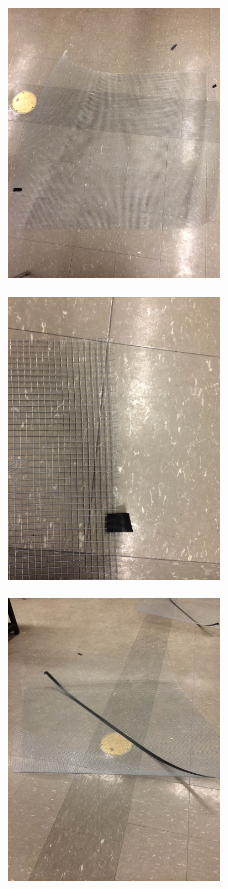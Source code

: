 \documentclass[11pt]{article} %
\begin{document}
\begin{figure}
  \centering
  \caption{   }
  \includegraphics[width=0.50\textwidth]{dish/08.jpeg}
\end{figure}

\begin{figure}
  \centering
  \caption{   }
  \includegraphics[width=0.50\textwidth]{dish/09.jpeg}
\end{figure}

\begin{figure}
  \centering
  \caption{   }
  \includegraphics[width=0.50\textwidth]{dish/10.jpeg}
\end{figure}
\end{document}
